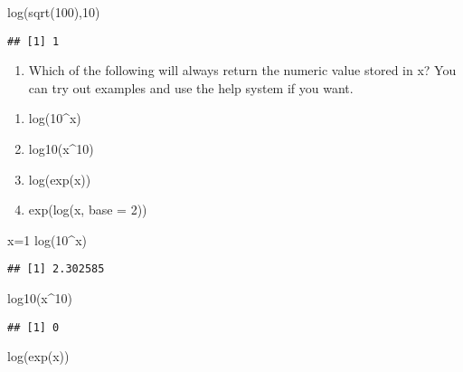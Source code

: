 \documentclass[
]{article}
\newenvironment{Shaded}{\begin{snugshade}}{\end{snugshade}}
\newcommand{\DecValTok}[1]{\textcolor[rgb]{0.00,0.00,0.81}{#1}}
\newcommand{\FunctionTok}[1]{\textcolor[rgb]{0.00,0.00,0.00}{#1}}
\newcommand{\NormalTok}[1]{#1}
\newcommand{\OtherTok}[1]{\textcolor[rgb]{0.56,0.35,0.01}{#1}}
\newcommand{\SpecialCharTok}[1]{\textcolor[rgb]{0.00,0.00,0.00}{#1}}
\providecommand{\tightlist}{%
  \setlength{\itemsep}{0pt}\setlength{\parskip}{0pt}}
\begin{document}
\begin{Shaded}
\begin{Highlighting}[]
\FunctionTok{log}\NormalTok{(}\FunctionTok{sqrt}\NormalTok{(}\DecValTok{100}\NormalTok{),}\DecValTok{10}\NormalTok{)}
\end{Highlighting}
\end{Shaded}

\begin{verbatim}
## [1] 1
\end{verbatim}

\begin{enumerate}
\def\labelenumi{\arabic{enumi}.}
\setcounter{enumi}{4}
\tightlist
\item
  Which of the following will always return the numeric value stored in
  x? You can try out examples and use the help system if you want.
\end{enumerate}

\begin{enumerate}
\def\labelenumi{\alph{enumi}.}
\tightlist
\item
  log(10\^{}x)
\item
  log10(x\^{}10)
\item
  log(exp(x))
\item
  exp(log(x, base = 2))
\end{enumerate}

\begin{Shaded}
\begin{Highlighting}[]
\NormalTok{x}\OtherTok{=}\DecValTok{1}
\FunctionTok{log}\NormalTok{(}\DecValTok{10}\SpecialCharTok{\^{}}\NormalTok{x)}
\end{Highlighting}
\end{Shaded}

\begin{verbatim}
## [1] 2.302585
\end{verbatim}

\begin{Shaded}
\begin{Highlighting}[]
\FunctionTok{log10}\NormalTok{(x}\SpecialCharTok{\^{}}\DecValTok{10}\NormalTok{)}
\end{Highlighting}
\end{Shaded}

\begin{verbatim}
## [1] 0
\end{verbatim}

\begin{Shaded}
\begin{Highlighting}[]
\FunctionTok{log}\NormalTok{(}\FunctionTok{exp}\NormalTok{(x))}
\end{Highlighting}
\end{Shaded}
\end{document}
